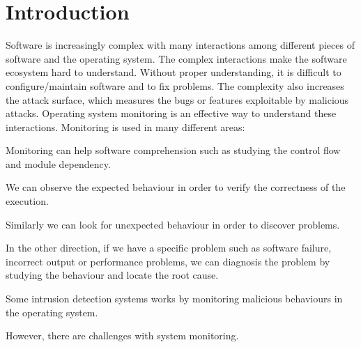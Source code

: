 \chapter{Introduction}

Software is increasingly complex with many interactions among
different pieces of software and the operating system.
The complex interactions make the software ecosystem hard to understand.
Without proper understanding,
it is difficult to configure/maintain software and to fix problems.
The complexity also increases the attack surface, which measures the
bugs or features exploitable by malicious attacks.
Operating system monitoring is an effective way to understand these
interactions.
Monitoring is used in many different areas:

\begin{tightitemize}
\item Monitoring can help software comprehension such as studying the control
flow and module dependency.
\item We can observe the expected behaviour in order to
verify the correctness of the execution.
\item Similarly we can look for unexpected behaviour in order to discover problems.
\item In the other direction, if we have a specific problem such as software failure,
incorrect output or performance problems, we can diagnosis the problem by
studying the behaviour and locate the root cause.
\item Some intrusion detection systems works by monitoring malicious
behaviours in the operating system.
\end{tightitemize}

However, there are challenges with system monitoring.

